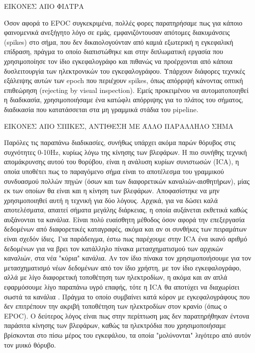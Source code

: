 \documentclass[11pt,a4paper,english,greek,twoside]{../Thesis}
\begin{document}
ΕΙΚΟΝΕΣ ΑΠΟ ΦΙΛΤΡΑ

\par Όσον αφορά το EPOC συγκεκριμένα, πολλές φορες παρατηρήσαμε πως για κάποιο φαινομενικά ανεξήγητο λόγο σε εμάς, εμφανιζόντουσαν απότομες διακυμάνσεις (spikes) στο σήμα, που δεν δικαιολογούνταν από καμιά εξωτερική η εγκεφαλική επίδραση, πράγμα το οποίο διαπιστώθηκε και στην διπλωματική εργασία \cite{artemis} που χρησιμοποίησε τον ίδιο εγκεφαλογράφο και πιθανώς να προέρχονται από κάποια δυσλειτουργία των ηλεκτρονικών του εγκεφαλογράφου. Υπάρχουν διάφορες τεχνικές εξάλειψης αυτών των epoch που περιέχουν spikes, όπως απόρριψή κάνοντας οπτική επιθεώρηση (rejecting by visual inspection). Εμείς προκειμένου να αυτοματοποιηθεί η διαδικασία, χρησιμοποιήσαμε ένα κατώφλι απόρριψης για το πλάτος του σήματος, διαδικασία που κατατάσσεται στα μη γραμμικά στάδια του pipeline.

ΕΙΚΟΝΕΣ ΑΠΟ ΣΠΙΚΕΣ, ΑΝΤΙΘΕΣΗ ΜΕ ΆΛΛΟ ΠΑΡΑΛΛΗΛΟ ΣΗΜΑ

\par Παρόλες τις παραπάνω διαδικασίες, συνήθως υπάρχει ακόμα παρών θόρυβος στις συχνότητες 0-10Hz, κυρίως λόγω της κίνησης των βλεφάρων. Η πιο συνήθης τεχνική απομάκρυνσης αυτού του θορύβου, είναι η ανάλυση κυρίων συνιστωσών (ICA), η οποία υποθέτει πως το παραγόμενο σήμα είναι το αποτέλεσμα του γραμμικού συνδυασμού πολλών πηγών (όσων και των διαφορετικών καναλιών-αισθητήρων), μίας εκ των οποίων θα είναι και η κίνηση των βλεφάρων. Αποφασίστηκε να μην χρησιμοποιηθεί αυτή η τεχνική για δύο λόγους. Αρχικά, για να δώσει καλά αποτελέσματα, απαιτεί σήματα μεγάλης διάρκειας, η οποία αυξάνεται εκθετικά καθώς αυξάνονται τα κανάλια. Είναι πολύ ευαίσθητη μέθοδος όσον αφορά την επεξεργασία δεδομένων από διαφορετικές καταγραφές, ακόμα και αν οι συνθήκες των πειραμάτων είναι σχεδόν ίδιες. Για παράδειγμα, έστω πως παρέχουμε στην ICA ένα ικανό αριθμό δεδομένων για να βρει τον κατάλληλο πίνακα μετασχηματισμού των αρχικών καναλιών, στα νέα "κύρια" κανάλια. Αν τον ίδιο πίνακα τον χρησιμοποιήσουμε για τον μετασχηματισμό νέων δεδομένων από τον ίδιο χρήστη, με τον ίδιο εγκεφαλογράφο, αλλά με λίγο διαφορετική τοποθέτηση των ηλεκτροδίων, η ακόμα και αν απλά εφαρμόσουμε λίγο παραπάνω υγρό επαφής, τότε η ICA θα αποτύχει να διαχωρίσει σωστά τα κανάλια \cite{noauthor_undated-vj}. Πράγμα το οποίο συμβαίνει κατά κόρον με εγκεφαλογράφους που δεν επιτρέπουν την ακριβή τοποθέτηση των ηλεκτροδίων στον κρανίο (όπως ο EPOC). Ο δεύτερος λόγος είναι πως στην περίπτωση μας δεν παρατηρήθηκαν έντονα παράσιτα κίνησης των βλεφάρων, καθώς τα ηλεκτρόδια που χρησιμοποιήσαμε βρίσκονται στο πίσω μέρος του εγκεφάλου, τα οποία "μολύνονται" λιγότερο από αυτόν τον μυικό θόρυβο.
\end{document}
